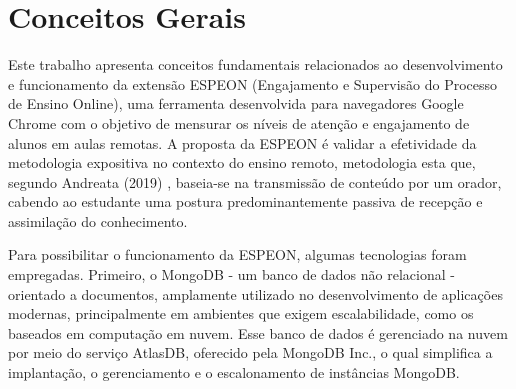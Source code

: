





\section{Conceitos Gerais}\label{sec:concepts}
Este trabalho apresenta conceitos fundamentais relacionados ao desenvolvimento e funcionamento da extensão ESPEON (Engajamento e Supervisão do Processo de Ensino Online), uma ferramenta desenvolvida para navegadores Google Chrome com o objetivo de mensurar os níveis de atenção e engajamento de alunos em aulas remotas. A proposta da ESPEON é validar a efetividade da metodologia expositiva no contexto do ensino remoto, metodologia esta que, segundo Andreata (2019) \cite{ANDREATA2019}, baseia-se na transmissão de conteúdo por um orador, cabendo ao estudante uma postura predominantemente passiva de recepção e assimilação do conhecimento.

Para possibilitar o funcionamento da ESPEON, algumas tecnologias foram empregadas. Primeiro, o MongoDB - um banco de dados não relacional - orientado a documentos, amplamente utilizado no desenvolvimento de aplicações modernas, principalmente em ambientes que exigem escalabilidade, como os baseados em computação em nuvem. Esse banco de dados é gerenciado na nuvem por meio do serviço AtlasDB, oferecido pela MongoDB Inc., o qual simplifica a implantação, o gerenciamento e o escalonamento de instâncias MongoDB.

